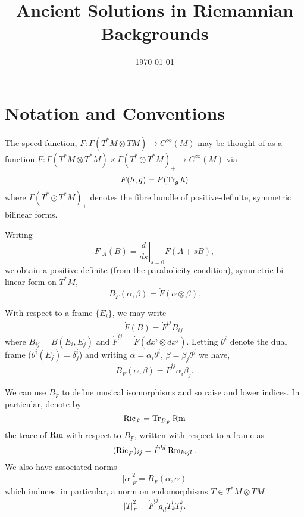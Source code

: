 \documentclass{amsart}
\begin{document}
\title[Ancient Solutions]
 {Ancient Solutions in Riemannian Backgrounds}

\curraddr{}
\email{}
\date{\today}

\dedicatory{}
\subjclass[2010]{}
\keywords{}

\begin{abstract}
\end{abstract}

\maketitle


\section{Notation and Conventions}
\label{sec:notation}

The speed function, \(F: \Gamma(T^{\ast}M \otimes TM) \to C^{\infty}(M)\) may be thought of as a function \(F : \Gamma(T^{\ast} M \otimes T^{\ast}M) \times \Gamma(T^{\ast} \odot T^{\ast}M)_+ \to C^{\infty}(M)\) via
\[
F(h, g) = F(\operatorname{Tr}_g h)
\]
where \(\Gamma(T^{\ast} \odot T^{\ast}M)_+\) denotes the fibre bundle of positive-definite, symmetric bilinear forms. 

Writing
\[
\dot{F}\left|_A\right. (B) = \left.\frac{d}{ds} \right|_{s=0} F(A + s B),
\]
we obtain a positive definite (from the parabolicity condition), symmetric bi-linear form on \(T^{\ast}M\),
\[
B_{\dot{F}} (\alpha, \beta) = \dot{F} ( \alpha \otimes \beta).
\]

With respect to a frame $\{E_i\}$, we may write
\[
\dot{F} (B) = \dot{F}^{ij} B_{ij}.
\]
where $B_{ij} = B(E_i, E_j)$ and $\dot{F}^{ij} = \dot{F} (dx^i \otimes dx^j)$. Letting $\theta^i$ denote the dual frame ($\theta^i(E_j) = \delta^i_j$) and writing $\alpha = \alpha_i \theta^i$, $\beta = \beta_j \theta^j$ we have,
\[
B_{\dot{F}} (\alpha, \beta) = \dot{F}^{ij} \alpha_i \beta_j.
\]

We can use \(B_{\dot{F}}\) to define musical isomorphisms and so raise and lower indices. In particular, denote by 
\[
\operatorname{Ric}_{\dot{F}} = \operatorname{Tr}_{B_{\dot{F}}} \operatorname{Rm}
\]
the trace of \(\operatorname{Rm}\) with respect to \(B_{\dot{F}}\), written with respect to a frame as
\[
(\operatorname{Ric}_{\dot{F}})_{ij} = \dot{F}^{kl} \operatorname{Rm}_{kijl}.
\]
We also have associated norms
\[
|\alpha|_{\dot{F}}^2 = B_{\dot{F}}(\alpha, \alpha)
\]
which induces, in particular, a norm on endomorphisms \(T \in T^{\ast}M \otimes TM\)
\[
|T|_{\dot{F}}^2 = \dot{F}^{ij} g_{il} T^l_k T^k_j.
\]
\end{document}
